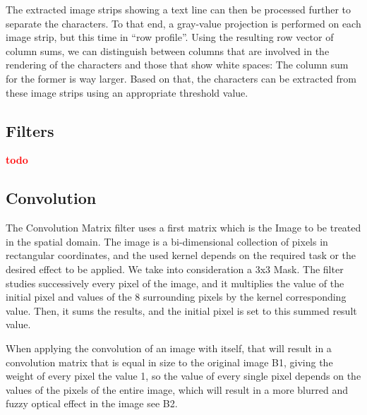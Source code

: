 \documentclass[a4paper,twocolumn]{article}
\newcommand{\twodo}{\vspace{11pt}\textcolor{red}{\textbf{todo}}}
\begin{document}
	The extracted image strips showing a text line can then be processed further to separate the characters. To that end, a gray-value projection is performed on each image strip, but this time in ``row profile''. Using the resulting row vector of column sums, we can distinguish between columns that are involved in the rendering of the characters and those that show white spaces: The column sum for the former is way larger. Based on that, the characters can be extracted from these image strips using an appropriate threshold value.
	
	\subsection{Filters}
	
	\twodo{}
	
	
	\subsection{Convolution}
	
	The Convolution Matrix  filter uses a  first matrix which is the Image to be treated in the spatial domain. The image is a bi-dimensional collection of pixels in rectangular coordinates, and the used kernel depends on the required task or the desired effect to be applied. We take into consideration a 3x3 Mask. The  filter studies successively every pixel of the image, and it multiplies the value of the initial pixel and values of the 8 surrounding pixels by the kernel corresponding value. Then, it sums the results, and the initial pixel is set to this summed result value.
	
	When applying the convolution of an image with itself, that will result in a convolution matrix that is equal in size to the original image B1, giving the weight of every pixel the value 1, so the value of every single pixel depends on the values of the pixels of the entire image, which will result in a more blurred and fuzzy optical effect in the image see B2.
	
\end{document}
